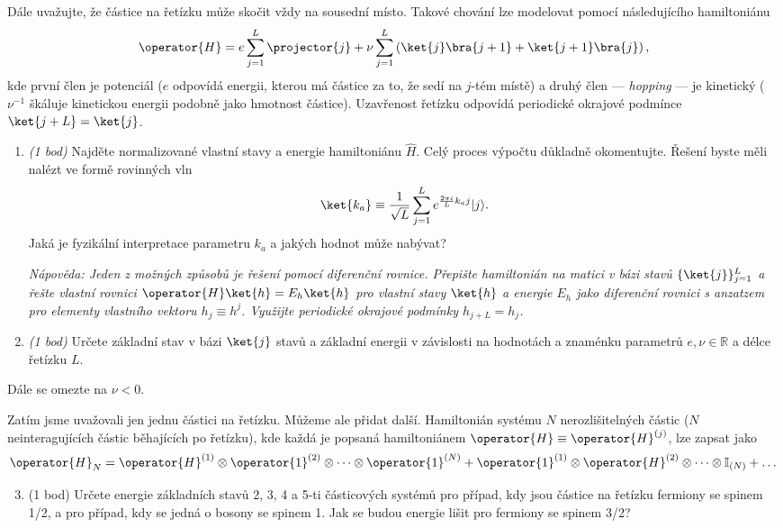 \documentclass[a4paper,11pt,twoside]{book}
\begin{document}
Dále uvažujte, že částice na řetízku může skočit vždy na sousední místo. 
Takové chování lze modelovat pomocí následujícího hamiltoniánu
\begin{equation*}
    \operator{H} = e\sum_{j = 1}^L\projector{j} + \nu\sum_{j = 1}^L \left(\ket{j}\bra{j+1} + \ket{j+1}\bra{j}\right),
\end{equation*}
kde první člen je potenciál ($e$ odpovídá energii, kterou má částice za to, že sedí na $j$-tém místě) a druhý člen --- \emph{hopping} --- je kinetický ($\nu^{-1}$ škáluje kinetickou energii podobně jako hmotnost částice).
Uzavřenost řetízku odpovídá periodické okrajové podmínce $\ket{j+L} =\ket{j}$.

\begin{enumerate}
    \item \emph{(1 bod)} Najděte normalizované vlastní stavy a energie hamiltoniánu $\hat{H}$. Celý proces výpočtu důkladně okomentujte.
    Řešení byste měli nalézt ve formě rovinných vln 
    \begin{equation*}
        \ket{k_a} \equiv \frac{1}{\sqrt{L}} \sum_{j=1}^L e^{\frac{2\pi i}{L}k_aj}|j\rangle.
    \end{equation*}
    Jaká je fyzikální interpretace parametru $k_a$ a jakých hodnot může nabývat?
    
    \textit{Nápověda: Jeden z možných způsobů je řešení pomocí diferenční rovnice. Přepište hamiltonián na matici v bázi stavů $\{\ket{j}\}_{j=1}^L$ a řešte vlastní rovnici $\operator{H}\ket{h}=E_h\ket{h}$ pro vlastní stavy $\ket{h}$ a energie $E_h$ jako diferenční rovnici s anzatzem pro elementy vlastního vektoru $h_j\equiv h^j$. 
    Využijte periodické okrajové podmínky $h_{j+L} = h_j$.}

   \item \emph{(1 bod)} Určete základní stav v bázi $\ket{j}$ stavů a základní energii v závislosti na hodnotách a znaménku parametrů $e,\nu \in \mathbb{R}$ a délce řetízku $L$.
\end{enumerate}

Dále se omezte na $\nu < 0$. 

Zatím jsme uvažovali jen jednu částici na řetízku. Můžeme ale přidat další. Hamiltonián systému $N$ nerozlišitelných částic ($N$ neinteragujících částic běhajících po řetízku), kde každá je popsaná hamiltoniánem $\operator{H}\equiv\operator{H}^{(j)}$, lze zapsat jako 
\begin{equation*}
    \operator{H}_N = \operator{H}^{(1)}\otimes\operator{1}^{(2)}\otimes\dots\otimes\operator{1}^{(N)} + \operator{1}^{(1)}\otimes\operator{H}^{(2)}\otimes\dots\otimes\mathbb{I}_{(N)}+ \dots
\end{equation*}
\begin{enumerate}
  \setcounter{enumi}{2}
  \item (1 bod) Určete energie základních stavů 2, 3, 4 a 5-ti částicových systémů pro případ, kdy jsou částice na řetízku fermiony se spinem 1/2, a pro případ, kdy se jedná o bosony se spinem 1. Jak se budou energie lišit pro fermiony se spinem 3/2?
\end{enumerate}
\end{document}
